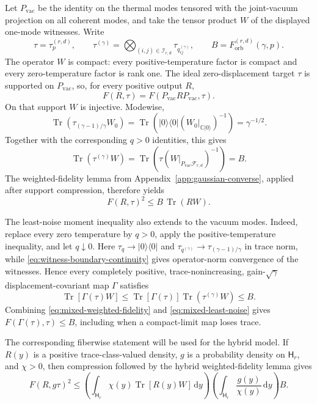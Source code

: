 \documentclass[11pt]{article}
\theoremstyle{remark}
\theoremstyle{plain}
\newcommand{\C}{\mathbb C}
\newcommand{\cF}{\mathcal F}
\newcommand{\dd}{\mathrm d}
\newcommand{\Tr}{\operatorname{Tr}}
\newcommand{\ket}[1]{|#1\rangle}
\newcommand{\proj}[1]{|#1\rangle\!\langle #1|}
\newcommand{\Forb}{F_{\mathrm{orb}}}
\begin{document}
Let \(P_{\mathrm{vac}}\) be the identity on the thermal modes tensored with
the joint-vacuum projection on all coherent modes, and take the tensor
product \(W\) of the displayed one-mode witnesses.  Write
\[
  \tau=\tau_p^{(r,d)},
  \qquad
  \tau^{(\gamma)}
  =\bigotimes_{(i,j)\in\mathcal I_{r,d}}\tau_{q_{ij}^{(\gamma)}},
  \qquad
  B=\Forb^{(r,d)}(\gamma,p).
\]
The operator \(W\) is compact: every positive-temperature factor is compact
and every zero-temperature factor is rank one.
The ideal zero-displacement target \(\tau\) is supported on
\(P_{\mathrm{vac}}\), so, for every positive output \(R\),
\[
  F(R,\tau)=F(P_{\mathrm{vac}}RP_{\mathrm{vac}},\tau).
\]
On that support \(W\) is injective.  Modewise,
\[
  \Tr(\tau_{(\gamma-1)/\gamma}W_0)
  =\Tr(\proj0(W_0|_{\C\ket0})^{-1})
  =\gamma^{-1/2}.
\]
Together with the corresponding \(q>0\) identities, this gives
\begin{equation}
  \Tr(\tau^{(\gamma)}W)
  =\Tr\!\left(\tau
    (W|_{P_{\mathrm{vac}}\cF_{r,d}})^{-1}\right)
  =B.
  \label{eq:mixed-witness-identities}
\end{equation}
The weighted-fidelity lemma from
Appendix~\ref{app:gaussian-converse}, applied after support compression,
therefore yields
\begin{equation}
  F(R,\tau)^2
  \le B\,\Tr(RW).
  \label{eq:mixed-weighted-fidelity}
\end{equation}

The least-noise moment inequality also extends to the vacuum modes.  Indeed,
replace every zero temperature by \(q>0\), apply the positive-temperature
inequality, and let \(q\downarrow0\).  Here
\(\tau_q\to\proj0\) and
\(\tau_{q^{(\gamma)}}\to\tau_{(\gamma-1)/\gamma}\) in trace norm, while
\eqref{eq:witness-boundary-continuity} gives operator-norm convergence of
the witnesses.  Hence every completely positive, trace-nonincreasing,
gain-\(\sqrt\gamma\) displacement-covariant map \(\Gamma\) satisfies
\begin{equation}
  \Tr[\Gamma(\tau)W]
  \le \Tr[\Gamma(\tau)]\Tr(\tau^{(\gamma)}W)
  \le B.
  \label{eq:mixed-least-noise}
\end{equation}
Combining \eqref{eq:mixed-weighted-fidelity} and
\eqref{eq:mixed-least-noise} gives
\(F(\Gamma(\tau),\tau)\le B\), including when a compact-limit map loses
trace.

The corresponding fiberwise statement will be used for the hybrid model.
If \(R(y)\) is a positive trace-class-valued density, \(g\) is a probability
density on \(\mathsf H_r\), and \(\chi>0\), then compression followed by
the hybrid weighted-fidelity lemma gives
\begin{equation}
  F(R,g\tau)^2
  \le
  \left(\int_{\mathsf H_r}
    \chi(y)\Tr[R(y)W]\,\dd y\right)
  \left(\int_{\mathsf H_r}\frac{g(y)}{\chi(y)}\,\dd y\right)B.
  \label{eq:mixed-hybrid-weighted-fidelity}
\end{equation}
\end{document}

